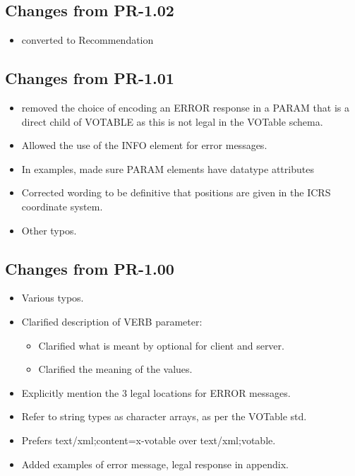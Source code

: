 \documentclass[11pt,a4paper]{ivoa} 
\begin{document}
\subsection{Changes from PR-1.02} 
\begin{itemize}[noitemsep] 
\item converted to Recommendation 
\end{itemize}

\subsection{Changes from PR-1.01} 
\begin{itemize}[noitemsep] 
\item removed the choice of encoding an ERROR response in a PARAM that is a
direct child of VOTABLE as this is not legal in the VOTable schema.
\item Allowed the use of the INFO element for error messages.  
\item In examples, made sure PARAM elements have datatype attributes 
\item Corrected wording to be definitive that positions are given in the ICRS
coordinate system.  
\item Other typos.  
\end{itemize}

\subsection{Changes from PR-1.00} 
\begin{itemize}[noitemsep] 
\item Various typos.  
\item Clarified description of VERB parameter:
	\begin{itemize}[noitemsep] 
	\item Clarified what is meant by optional for
	client and server.  
	\item Clarified the meaning of the values.
	\end{itemize} 
\item Explicitly mention the 3 legal locations for ERROR
messages.  
\item Refer to string types as character arrays, as per the
VOTable std.  
\item Prefers text/xml;content=x-votable over
text/xml;votable.  
\item Added examples of error message, legal response
in appendix.  
\end{itemize}
\end{document}
